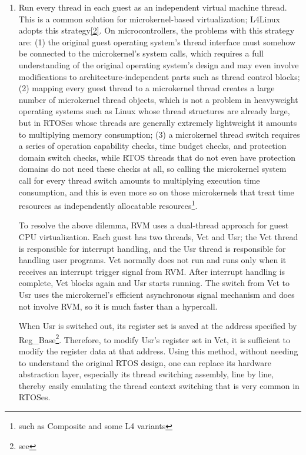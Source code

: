 \begin{enumerate}
potentially causing a stack overflow in an embedded environment. Therefore, even though (2) is very efficient in Xen, we do not adopt this approach.
\item
  Run every thread in each guest as an independent virtual machine thread. This is a common solution for microkernel-based virtualization; L4Linux adopts this strategy\protect\hyperref[cite:2-2]{{[}2{]}}. On microcontrollers, the problems with this strategy are: (1) the original guest operating system's thread interface must somehow be connected to the microkernel's system calls, which requires a full understanding of the original operating system's design and may even involve modifications to architecture-independent parts such as thread control blocks; (2) mapping every guest thread to a microkernel thread creates a large number of microkernel thread objects, which is not a problem in heavyweight operating systems such as Linux whose thread structures are already large, but in RTOSes whose threads are generally extremely lightweight it amounts to multiplying memory consumption; (3) a microkernel thread switch requires a series of operation capability checks, time budget checks, and protection domain switch checks, while RTOS threads that do not even have protection domains do not need these checks at all, so calling the microkernel system call for every thread switch amounts to multiplying execution time consumption, and this is even more so on those microkernels that treat time resources as independently allocatable resources\footnote{such as Composite and some L4 variants}.

  To resolve the above dilemma, RVM uses a dual-thread approach for guest CPU virtualization. Each guest has two threads, Vct and Usr; the Vct thread is responsible for interrupt handling, and the Usr thread is responsible for handling user programs. Vct normally does not run and runs only when it receives an interrupt trigger signal from RVM. After interrupt handling is complete, Vct blocks again and Usr starts running. The switch from Vct to Usr uses the microkernel's efficient asynchronous signal mechanism and does not involve RVM, so it is much faster than a hypercall.

  When Usr is switched out, its register set is saved at the address specified by Reg\_Base\footnote{see }. Therefore, to modify Usr's register set in Vct, it is sufficient to modify the register data at that address. Using this method, without needing to understand the original RTOS design, one can replace its hardware abstraction layer, especially its thread switching assembly, line by line, thereby easily emulating the thread context switching that is very common in RTOSes.
\end{enumerate}

